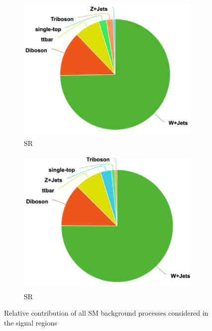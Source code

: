 \begin{figure}[h]
  \centering
     \begin{subfigure}{0.49\textwidth}
     \includegraphics[width = 0.98\textwidth]{Figures/4/background_yield_breakdown_merged_SR.pdf}
    \caption{\merged SR}
    \label{fig:background_yield_breakdown_merged_SR}
     \end{subfigure}
    \begin{subfigure}{0.49\textwidth}
     \includegraphics[width = 0.98\textwidth]{Figures/4/background_yield_breakdown_resolved_SR.pdf}
     \caption{\resolved SR}
     \label{fig:background_yield_breakdown_resolved_SR}
     \end{subfigure}
     \caption{Relative contribution of all SM background processes considered in the signal regions}
     \label{fig:background_yield_breakdown}
  \end{figure}


